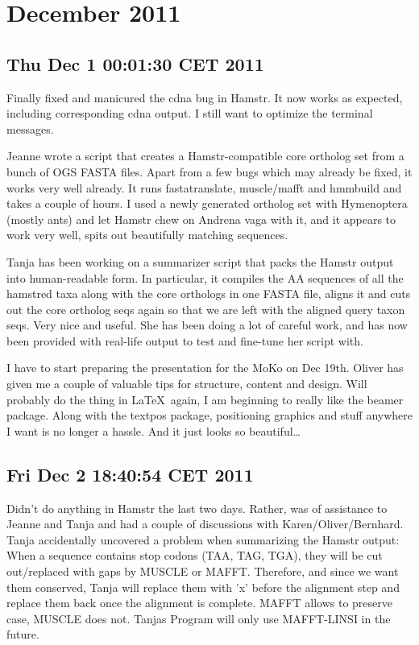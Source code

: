 \section{December 2011}
\subsection*{Thu Dec  1 00:01:30 CET 2011}

Finally fixed and manicured the cdna bug in Hamstr. It now works as expected,
including corresponding cdna output. I still want to optimize the terminal
messages.

Jeanne wrote a script that creates a Hamstr-compatible core ortholog set from a
bunch of OGS FASTA files. Apart from a few bugs which may already be fixed, it
works very well already. It runs fastatranslate, muscle/mafft and hmmbuild and
takes a couple of hours. I used a newly generated ortholog set with Hymenoptera
(mostly ants) and let Hamstr chew on Andrena vaga with it, and it appears to
work very well, spits out beautifully matching sequences. 

Tanja has been working on a summarizer script that packs the Hamstr output into
human-readable form. In particular, it compiles the AA sequences of all the
hamstred taxa along with the core orthologs in one FASTA file, aligns it and
cuts out the core ortholog seqs again so that we are left with the aligned query
taxon seqs. Very nice and useful. She has been doing a lot of careful work, and
has now been provided with real-life output to test and fine-tune her script
with.

I have to start preparing the presentation for the MoKo on Dec 19th. Oliver has
given me a couple of valuable tips for structure, content and design. Will
probably do the thing in \LaTeX\ again, I am beginning to really like the beamer
package. Along with the textpos package, positioning graphics and stuff anywhere
I want is no longer a hassle. And it just looks so beautiful\ldots

\subsection*{Fri Dec  2 18:40:54 CET 2011}

Didn't do anything in Hamstr the last two days. Rather, was of assistance to
Jeanne and Tanja and had a couple of discussions with Karen/Oliver/Bernhard.
Tanja accidentally uncovered a problem when summarizing the Hamstr output: When
a sequence contains stop codons (TAA, TAG, TGA), they will be cut out/replaced
with gaps by MUSCLE or MAFFT. Therefore, and since we want them conserved, Tanja
will replace them with 'x' before the alignment step and replace them back once
the alignment is complete. MAFFT allows to preserve case, MUSCLE does not.
Tanjas Program will only use MAFFT-LINSI in the future.

